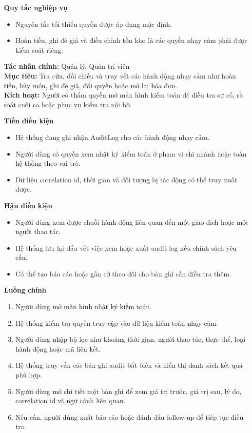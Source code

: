 \documentclass[11pt,a4paper]{article}
\begin{document}
\begin{usecasebox}[title={UC-ADM-02 --- Quản lý vai trò và phân quyền}]
    \textbf{Quy tắc nghiệp vụ}
    \begin{itemize}[leftmargin=1.8em]
  \item Nguyên tắc tối thiểu quyền được áp dụng mặc định.
  \item Hoàn tiền, ghi đè giá và điều chỉnh tồn kho là các quyền nhạy cảm phải được kiểm soát riêng.
\end{itemize}
    \end{usecasebox}



    \begin{usecasebox}[title={UC-ADM-03 --- Xem nhật ký kiểm toán và truy vết thao tác nhạy cảm}]
    \textbf{Tác nhân chính:} Quản lý, Quản trị viên\\
    \textbf{Mục tiêu:} Tra cứu, đối chiếu và truy vết các hành động nhạy cảm như hoàn tiền, hủy món, ghi đè giá, đổi quyền hoặc mở lại hóa đơn.\\
    \textbf{Kích hoạt:} Người có thẩm quyền mở màn hình kiểm toán để điều tra sự cố, rà soát cuối ca hoặc phục vụ kiểm tra nội bộ.

    \medskip
    \textbf{Tiền điều kiện}
    \begin{itemize}[leftmargin=1.8em]
  \item Hệ thống đang ghi nhận \textsf{AuditLog} cho các hành động nhạy cảm.
  \item Người dùng có quyền xem nhật ký kiểm toán ở phạm vi chi nhánh hoặc toàn hệ thống theo vai trò.
  \item Dữ liệu correlation id, thời gian và đối tượng bị tác động có thể truy xuất được.
\end{itemize}

    \textbf{Hậu điều kiện}
    \begin{itemize}[leftmargin=1.8em]
  \item Người dùng xem được chuỗi hành động liên quan đến một giao dịch hoặc một người thao tác.
  \item Hệ thống lưu lại dấu vết việc xem hoặc xuất audit log nếu chính sách yêu cầu.
  \item Có thể tạo báo cáo hoặc gắn cờ theo dõi cho bản ghi cần điều tra thêm.
\end{itemize}

    \textbf{Luồng chính}
    \begin{enumerate}[leftmargin=1.8em]
  \item Người dùng mở màn hình nhật ký kiểm toán.
  \item Hệ thống kiểm tra quyền truy cập vào dữ liệu kiểm toán nhạy cảm.
  \item Người dùng nhập bộ lọc như khoảng thời gian, người thao tác, thực thể, loại hành động hoặc mã liên kết.
  \item Hệ thống truy vấn các bản ghi audit bất biến và hiển thị danh sách kết quả phù hợp.
  \item Người dùng mở chi tiết một bản ghi để xem giá trị trước, giá trị sau, lý do, correlation id và ngữ cảnh liên quan.
  \item Nếu cần, người dùng xuất báo cáo hoặc đánh dấu follow-up để tiếp tục điều tra.
\end{enumerate}


\end{usecasebox}
\end{document}

